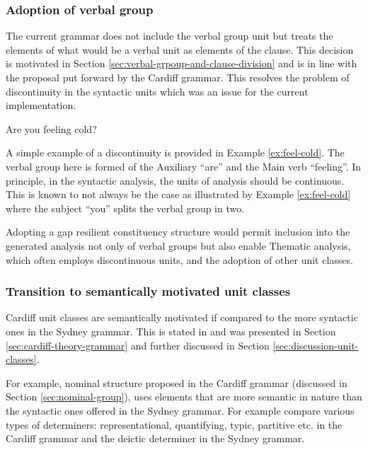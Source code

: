\subsubsection{Adoption of verbal group}

    The current grammar does not include the verbal group unit but treats the elements of what would be a verbal unit as elements of the clause. This decision is motivated in Section \ref{sec:verbal-grpoup-and-clause-division} and is in line with the proposal put forward by the Cardiff grammar. This resolves the problem of discontinuity in the syntactic units which was an issue for the current implementation.
    
    \begin{exe}
        \ex\label{ex:feel-cold} Are you feeling cold?
    \end{exe}
    
    A simple example of a discontinuity is provided in Example \ref{ex:feel-cold}. The verbal group here is formed of the Auxiliary ``are'' and the Main verb ``feeling''. In principle, in the syntactic analysis, the units of analysis should be continuous. This is known to not always be the case as illustrated by Example \ref{ex:feel-cold} where the subject ``you'' splits the verbal group in two.
    
    Adopting a gap resilient constituency structure would permit inclusion into the generated analysis not only of verbal groups but also enable Thematic analysis, which often employs discontinuous units, and the adoption of other unit classes.

\subsubsection{Transition to semantically motivated unit classes}

    Cardiff unit classes are semantically motivated if compared to the more syntactic ones in the Sydney grammar. This is stated in \citet[193--194]{Fawcett2000} and was presented in Section \ref{sec:cardiff-theory-grammar} and further discussed in Section \ref{sec:discussion-unit-classes}.

    For example, nominal structure proposed in the Cardiff grammar (discussed in Section \ref{sec:nominal-group}), uses elements that are more semantic in nature than the syntactic ones offered in the Sydney grammar. For example compare various types of determiners: representational, quantifying, typic, partitive etc. in the Cardiff grammar and the deictic determiner in the Sydney grammar. 
    
